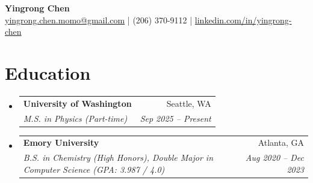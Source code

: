 \documentclass[11pt, letterpaper]{article}
\makeatletter
\newcommand{\resumeSubheading}[4]{
  \vspace{2pt}\item
    \begin{tabular*}{1.0\textwidth}[t]{l@{\extracolsep{\fill}}r}
      \textbf{#1} & #2 \\
      \textit{\small#3} & \textit{\small #4} \\
    \end{tabular*}\vspace{-6pt}
}
\makeatother
\begin{document}
\begin{center}
    {\LARGE \textbf{Yingrong Chen}} \\ \vspace{2pt}
    \small{
    \href{mailto:yingrong.chen.momo@gmail.com}{yingrong.chen.momo@gmail.com} \;|\;
    (206) 370-9112 \;|\;
    \href{https://linkedin.com/in/yingrong-chen}{linkedin.com/in/yingrong-chen}
    }
\end{center}
\vspace{-8pt}

\section{Education}
\begin{itemize}[leftmargin=0in, label={}, itemsep=-2pt]
    \resumeSubheading
      {University of Washington}{Seattle, WA}
      {M.S. in Physics (Part-time)}{Sep 2025 -- Present}
    \vspace{2pt}
    \resumeSubheading
      {Emory University}{Atlanta, GA}
      {B.S. in Chemistry (High Honors), Double Major in Computer Science (GPA: 3.987 / 4.0)}{Aug 2020 -- Dec 2023}
\end{itemize}

\end{document}
